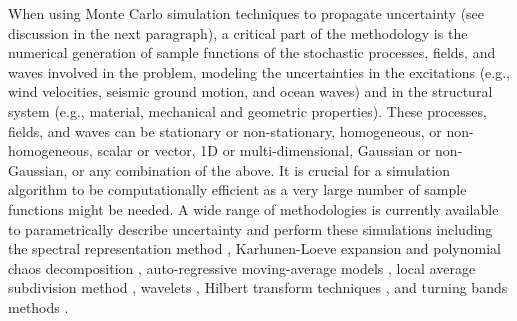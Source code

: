 When using Monte Carlo simulation techniques to propagate uncertainty (see discussion in the next paragraph), a critical part of the methodology is the numerical generation of sample functions of the stochastic processes, fields, and waves involved in the problem, modeling the uncertainties in the excitations (e.g., wind velocities, seismic ground motion, and ocean waves) and in the structural system (e.g., material, mechanical and geometric properties). These processes, fields, and waves can be stationary or non-stationary, homogeneous, or non-homogeneous, scalar or vector, 1D or multi-dimensional, Gaussian or non-Gaussian, or any combination of the above. It is crucial for a simulation algorithm to be computationally efficient as a very large number of sample functions might be needed. A wide range of methodologies is currently available to parametrically describe uncertainty and perform these simulations including the spectral representation method \citep{li1991simulation, shinozuka1991simulation, shields2011simple, benowitz2015simulation}, Karhunen-Loeve expansion and polynomial chaos decomposition \citep{ghanem1991stochastic}, auto-regressive moving-average models \citep{spanos1983arma,deodatis1988autoregressive}, local average subdivision method \citep{fenton1990simulation}, wavelets \citep{zeldin1996random}, Hilbert transform techniques \citep{wang2014modeling}, and turning bands methods \citep{mantoglou1982turning}.

